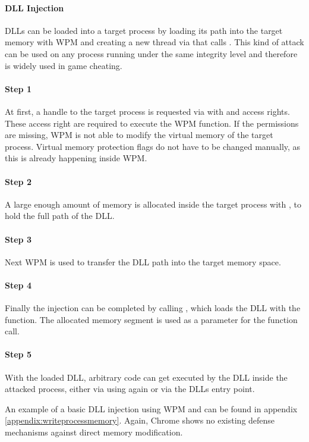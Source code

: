 \paragraph{ DLL Injection}
\glspl{DLL} can be loaded into a target process by loading its path into the target memory with \gls{WPM} and creating a new thread via  that calls . This kind of attack can be used on any process running under the same integrity level and therefore is widely used in game cheating.

\paragraph{Step 1} 
At first, a handle to the target process is requested via  with  and  access rights. These access right are required to execute the \gls{WPM} function. If the permissions are missing, \gls{WPM} is not able to modify the virtual memory of the target process. Virtual memory protection flags do not have to be changed manually, as this is already happening inside \gls{WPM}. 

\paragraph{Step 2} 
A large enough amount of memory is allocated inside the target process with , to hold the full path of the \gls{DLL}. 

\paragraph{Step 3}
Next \gls{WPM} is used to transfer the \gls{DLL} path into the target memory space.

\paragraph{Step 4}
Finally the injection can be completed by calling , which loads the \gls{DLL} with the  function. The allocated memory segment is used as a parameter for the  function call. 

\paragraph{Step 5}
With the loaded \gls{DLL}, arbitrary code can get executed by the \gls{DLL} inside the attacked process, either via using  again or via the \glspl{DLL} entry point.


An example of a basic \gls{DLL} injection using \gls{WPM} and  can be found in appendix \ref{appendix:writeprocessmemory}. Again, Chrome shows no existing defense mechanisms against direct memory modification.